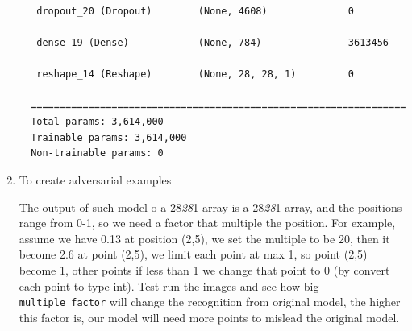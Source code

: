 \documentclass[
]{article}
\begin{document}
\begin{enumerate}
\begin{verbatim}
   dropout_20 (Dropout)        (None, 4608)              0         

   dense_19 (Dense)            (None, 784)               3613456   

   reshape_14 (Reshape)        (None, 28, 28, 1)         0         

  =================================================================
  Total params: 3,614,000
  Trainable params: 3,614,000
  Non-trainable params: 0
\end{verbatim}

\item
  To create adversarial examples

  The output of such model o a 28\emph{28}1 array is a 28\emph{28}1
  array, and the positions range from 0-1, so we need a factor that
  multiple the position. For example, assume we have 0.13 at position
  (2,5), we set the multiple to be 20, then it become 2.6 at point
  (2,5), we limit each point at max 1, so point (2,5) become 1, other
  points if less than 1 we change that point to 0 (by convert each point
  to type int). Test run the images and see how big
  \texttt{multiple\_factor} will change the recognition from original
  model, the higher this factor is, our model will need more points to
  mislead the original model.


\end{enumerate}
\end{document}
